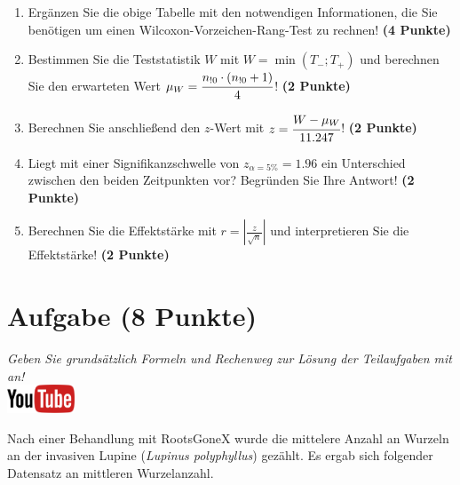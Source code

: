 \documentclass[a4paper, 10pt]{scrartcl}\usepackage[]{graphicx}\usepackage[]{xcolor}
\begin{document}
\begin{enumerate}
\item Erg{\"a}nzen Sie die obige Tabelle mit den notwendigen Informationen, die
  Sie ben{\"o}tigen um einen Wilcoxon-Vorzeichen-Rang-Test zu rechnen!
  \textbf{(4 Punkte)}
\item Bestimmen Sie die Teststatistik $W$ mit $W = \min(T_{-}; T_{+})$ und
  berechnen Sie den erwarteten Wert $\mu_W = \cfrac{n_{!0} \cdot (n_{!0} + 1)}{4}$!
  \textbf{(2 Punkte)}
\item Berechnen Sie anschlie{\ss}end den $z$-Wert mit $z = \cfrac{W -
    \mu_W}{11.247}$! \textbf{(2 Punkte)}
\item Liegt mit einer Signifikanzschwelle von $z_{\alpha = 5\%} =
  1.96$ ein Unterschied zwischen den beiden Zeitpunkten vor? Begr{\"u}nden Sie
  Ihre Antwort! \textbf{(2 Punkte)} 
\item Berechnen Sie die Effektst{\"a}rke mit $r = |\frac{z}{\sqrt{n}}| $ und
  interpretieren Sie die Effektst{\"a}rke! \textbf{(2 Punkte)} 
\end{enumerate} 
\clearpage

\section{Aufgabe \hfill (8 Punkte)}

\textit{Geben Sie grunds{\"a}tzlich Formeln und Rechenweg zur L{\"o}sung der
  Teilaufgaben mit an!} \\[1Ex]

\hfill\href{https://youtu.be/5tiJFxuZcco}{\includegraphics[width =
  2cm]{img/youtube}} %
\hspace{2Ex}




Nach einer Behandlung mit RootsGoneX wurde die mittelere Anzahl an Wurzeln
an der invasiven Lupine (\textit{Lupinus polyphyllus}) gez{\"a}hlt. Es ergab sich
folgender Datensatz an mittleren Wurzelanzahl.
\end{document}
